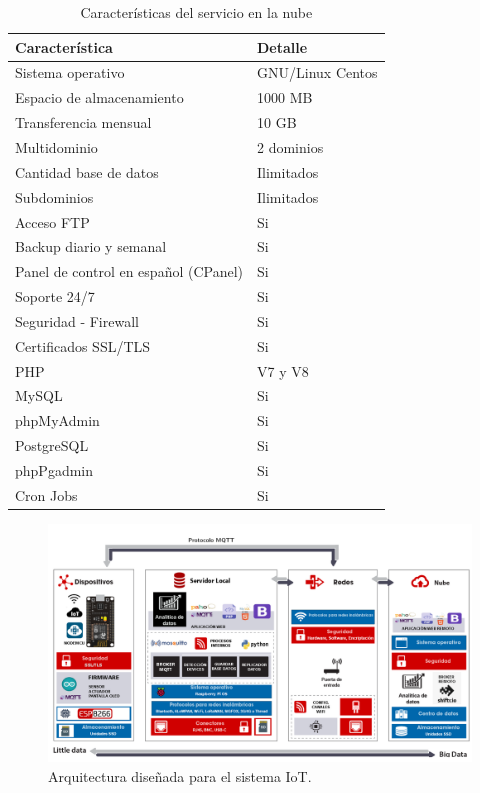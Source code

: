 \begin{table}[h]
	\centering
	\caption[Características del servicio en la nube]{Características del servicio en la nube}
	\begin{tabular}{p{7cm} p{5cm} }    
		\toprule
		\textbf{Característica} 	 & \textbf{Detalle}  \\
		\midrule
		Sistema operativo  & GNU/Linux Centos\\		
		Espacio de almacenamiento & 1000 MB \\
		Transferencia mensual  & 10 GB\\		
		Multidominio & 2 dominios\\		
		Cantidad base de datos 	  & Ilimitados\\
		Subdominios 	  & Ilimitados\\
		Acceso FTP 	  & Si\\
		Backup diario y semanal 	  & Si\\
		Panel de control en español (CPanel) 	  & Si\\
		Soporte 24/7 	  & Si\\
		Seguridad - Firewall	  & Si\\
		Certificados SSL/TLS	  & Si\\
		PHP	  & V7 y V8\\
		MySQL	  & Si\\
		phpMyAdmin	  & Si\\
		PostgreSQL	  & Si\\
		phpPgadmin	  & Si\\
		Cron Jobs	  & Si\\
		\bottomrule
		\hline
	\end{tabular}
	\label{tab:serverweb}
\end{table}

\vspace{0.5cm}
\begin{landscape} %
\begin{figure}[htpb]
\centering 
\includegraphics[width=1.65\textwidth]{./Figures/arquitectura-listo.png}
\caption{Arquitectura diseñada para el sistema IoT.}
\label{fig:arquitectura}
\end{figure}
\end{landscape} %

